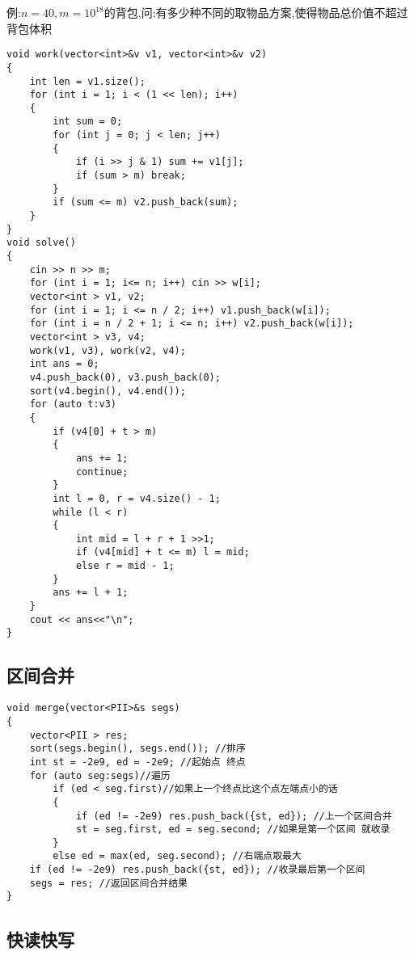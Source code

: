 \documentclass[a4paper, fontset=none]{ctexart}
\begin{document}
例:$n=40, m=10^{18}$的背包,问:有多少种不同的取物品方案,使得物品总价值不超过背包体积

\begin{verbatim}
void work(vector<int>&v v1, vector<int>&v v2)
{
    int len = v1.size();
    for (int i = 1; i < (1 << len); i++)
    {
        int sum = 0;
        for (int j = 0; j < len; j++)
        {
            if (i >> j & 1) sum += v1[j];
            if (sum > m) break;
        }
        if (sum <= m) v2.push_back(sum);
    }
}
void solve()
{
    cin >> n >> m;
    for (int i = 1; i<= n; i++) cin >> w[i];
    vector<int > v1, v2;
    for (int i = 1; i <= n / 2; i++) v1.push_back(w[i]);
    for (int i = n / 2 + 1; i <= n; i++) v2.push_back(w[i]);
    vector<int > v3, v4;
    work(v1, v3), work(v2, v4);
    int ans = 0;
    v4.push_back(0), v3.push_back(0);
    sort(v4.begin(), v4.end());
    for (auto t:v3)
    {
        if (v4[0] + t > m)
        {
            ans += 1;
            continue;
        }
        int l = 0, r = v4.size() - 1;
        while (l < r)
        {
            int mid = l + r + 1 >>1;
            if (v4[mid] + t <= m) l = mid;
            else r = mid - 1;
        }
        ans += l + 1;
    }
    cout << ans<<"\n";
}
\end{verbatim}
\subsection{区间合并}

\begin{verbatim}
void merge(vector<PII>&s segs)
{
    vector<PII > res;
    sort(segs.begin(), segs.end()); //排序
    int st = -2e9, ed = -2e9; //起始点 终点
    for (auto seg:segs)//遍历
        if (ed < seg.first)//如果上一个终点比这个点左端点小的话
        {
            if (ed != -2e9) res.push_back({st, ed}); //上一个区间合并
            st = seg.first, ed = seg.second; //如果是第一个区间 就收录
        }
        else ed = max(ed, seg.second); //右端点取最大
    if (ed != -2e9) res.push_back({st, ed}); //收录最后第一个区间
    segs = res; //返回区间合并结果
}
\end{verbatim}
\subsection{快读快写}
\end{document}
